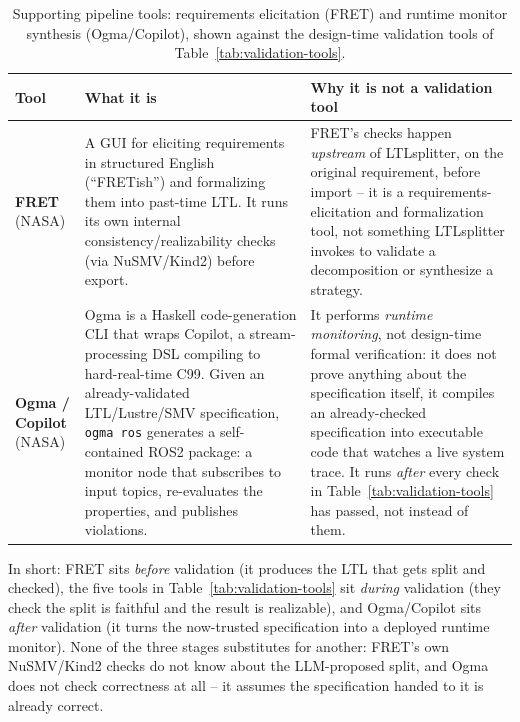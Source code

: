 \documentclass[11pt]{article}
\begin{document}
\begin{table}[htbp]
\centering
\footnotesize
\begin{tabularx}{\textwidth}{@{} l >{\raggedright\arraybackslash}X >{\raggedright\arraybackslash}X @{}}
\toprule
\textbf{Tool} & \textbf{What it is} & \textbf{Why it is not a validation tool} \\
\midrule
\textbf{FRET} (NASA)
  & A GUI for eliciting requirements in structured English (``FRETish'') and formalizing them into past-time LTL. It runs its own internal consistency/realizability checks (via NuSMV/Kind2) before export.
  & FRET's checks happen \emph{upstream} of LTLsplitter, on the original requirement, before import -- it is a requirements-elicitation and formalization tool, not something LTLsplitter invokes to validate a decomposition or synthesize a strategy. \\
\textbf{Ogma / Copilot} (NASA)
  & Ogma is a Haskell code-generation CLI that wraps Copilot, a stream-processing DSL compiling to hard-real-time C99. Given an already-validated LTL/Lustre/SMV specification, \texttt{ogma ros} generates a self-contained ROS2 package: a monitor node that subscribes to input topics, re-evaluates the properties, and publishes violations.
  & It performs \emph{runtime monitoring}, not design-time formal verification: it does not prove anything about the specification itself, it compiles an already-checked specification into executable code that watches a live system trace. It runs \emph{after} every check in Table~\ref{tab:validation-tools} has passed, not instead of them. \\
\bottomrule
\end{tabularx}
\caption{Supporting pipeline tools: requirements elicitation (FRET) and runtime monitor synthesis (Ogma/Copilot), shown against the design-time validation tools of Table~\ref{tab:validation-tools}.}
\label{tab:pipeline-tools}
\end{table}

In short: FRET sits \emph{before} validation (it produces the LTL that gets split and checked),
the five tools in Table~\ref{tab:validation-tools} sit \emph{during} validation (they check the
split is faithful and the result is realizable), and Ogma/Copilot sits \emph{after} validation
(it turns the now-trusted specification into a deployed runtime monitor). None of the three
stages substitutes for another: FRET's own NuSMV/Kind2 checks do not know about the LLM-proposed
split, and Ogma does not check correctness at all -- it assumes the specification handed to it
is already correct.
\end{document}
